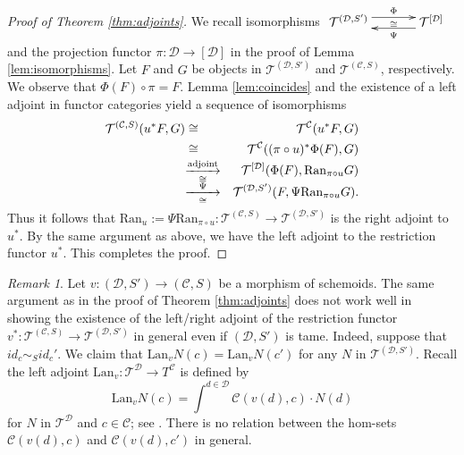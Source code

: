 \documentclass{amsart}
\theoremstyle{definition}
\theoremstyle{remark}
\newtheorem{rem}[thm]{Remark}
\newcommand{\C}{{\mathcal C}}
\newcommand{\T}{{\mathcal T}}
\newcommand{\D}{\mathcal{D}}
\newcommand{\maprightud}[2]{%
\smash{\mathop{%
 \hbox to 1cm{\rightarrowfill}}\limits^{#1}_{#2}}}
\newcounter{eqn}[section]
\begin{document}
\begin{proof}[Proof of Theorem \ref{thm:adjoints}] We recall isomorphisms 
$\xymatrix@C35pt@R20pt{
\T^{(\D, S')}  \ar@<1ex>[r]^-{\Phi}_-{\cong} &
\T^{[\D]}   \ar@<1ex>[l]^-{\Psi} } $
and the projection functor $\pi : \D \to [\D]$ 
in the proof of Lemma \ref{lem:isomorphisms}. 
Let $F$ and $G$ be objects in $\T^{(\D, S')}$ and 
$\T^{(\C, S)}$, respectively. 
We observe that $\Phi(F)\circ \pi = F$. 
Lemma \ref{lem:coincides} and the existence of a left adjoint in functor categories yield a sequence of isomorphisms 
%
\begin{eqnarray*}
\T^{(\C, S)}(u^*F, G) &\cong& \T^{\C}(u^*F, G) \\
&\cong &  \T^{\C}((\pi\circ u)^*\Phi(F), G) \\
&\maprightud{\text{adjoint}}{\cong} &   \T^{[\D]}(\Phi(F), \text{Ran}_{\pi\circ u}G) \\
& \maprightud{\Psi}{\cong}& 
\T^{(\D, S')}(F, \Psi\text{Ran}_{\pi\circ u}G).  
\end{eqnarray*}
Thus it follows that $\text{Ran}_u:=\Psi\text{Ran}_{\pi\circ u} : \T^{(\C, S)} \to \T^{(\D, S')}$ is the right adjoint to 
$u^*$. By the same argument as above, we have the left adjoint to the restriction functor $u^*$. This completes the proof.
\end{proof}


\begin{rem}\label{rem:inverse}
Let $v : (\D, S') \to (\C, S)$ be a morphism of schemoids. The same argument as in the proof of 
Theorem  \ref{thm:adjoints} does not work well in showing the existence of the left/right adjoint of the restriction functor $v^* : \T^{(\C, S)} \to \T^{(\D, S')}$ in general even if $(\D, S')$ is tame. Indeed, suppose that 
$id_c \sim_S id_c'$. We claim that $\text{Lan}_vN (c) = \text{Lan}_vN (c')$ for any $N$ in $\T^{(\D, S')}$. 
Recall the left adjoint $\text{Lan}_v :  \T^\D \to T^\C$ is defined by 
$$
\text{Lan}_vN (c) = \displaystyle\int^{d \in \D} \C(v(d), c)\cdot N(d)
$$
for $N$ in $\T^{\D}$ and $c \in \C$; see \cite[X]{M}.  There is no relation between the hom-sets 
$\C(v(d), c)$ and $\C(v(d), c')$ in general. 
\end{rem}
\end{document}

